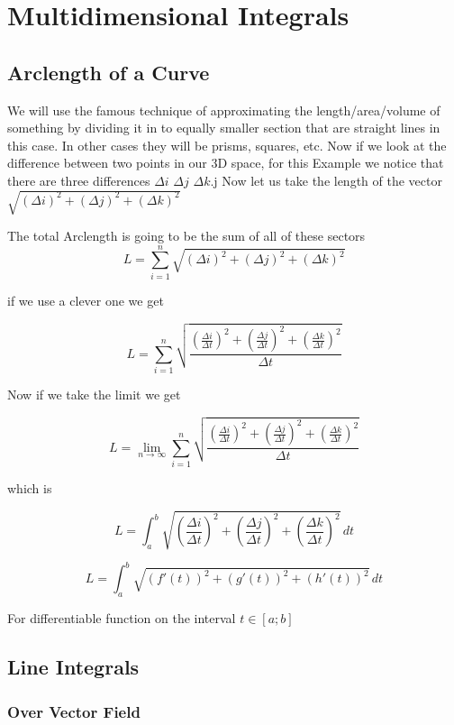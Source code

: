 \newpage
\section{Multidimensional Integrals}

\subsection{Arclength of a Curve}

We will use the famous technique of approximating the length/area/volume of something
by dividing it in to equally smaller section that are straight lines in this case. In other cases 
they will be prisms, squares, etc. Now if we look at the difference between two points in our 3D space, 
for this Example
we notice that there are three differences \(\Delta i\) \(\Delta j\) \(\Delta k\).j
Now let us take the length of the vector \(\sqrt{{(\Delta i)}^2 + {(\Delta j)}^2 + {(\Delta k)}^2}\)

The total Arclength is going to be the sum of all of these sectors
\[
L =  \sum_{i = 1}^{n}\sqrt{{(\Delta i)}^2 + {(\Delta j)}^2 + {(\Delta k)}^2}
\]

if we use a clever one we get

\[
L =  \sum_{i = 1}^{n}\sqrt{\frac{{\left(\frac{\Delta i}{\Delta t}\right)}^2 + {\left(\frac{\Delta j}{\Delta t}\right)}^2 + {\left(\frac{\Delta k}{\Delta t}\right)}^2}{\Delta t}}
\]

Now if we take the limit we get

\[
L =  \lim_{n\to \infty}\sum_{i = 1}^{n}\sqrt{\frac{{\left(\frac{\Delta i}{\Delta t}\right)}^2 + {\left(\frac{\Delta j}{\Delta t}\right)}^2 + {\left(\frac{\Delta k}{\Delta t}\right)}^2}{\Delta t}}
\]

which is 

\[
L =  \int_{a}^{b}\sqrt{{\left(\frac{\Delta i}{\Delta t}\right)}^2 + {\left(\frac{\Delta j}{\Delta t}\right)}^2 + {\left(\frac{\Delta k}{\Delta t}\right)}^2}\,dt
\]

\[
L =  \int_{a}^{b}\sqrt{{(f'(t))}^2 + {(g'(t))}^2 + {(h'(t))}^2}\,dt
\]

For differentiable function on the interval \(t \in [a; b]\)

\subsection{Line Integrals}

\subsubsection{Over Vector Field}

